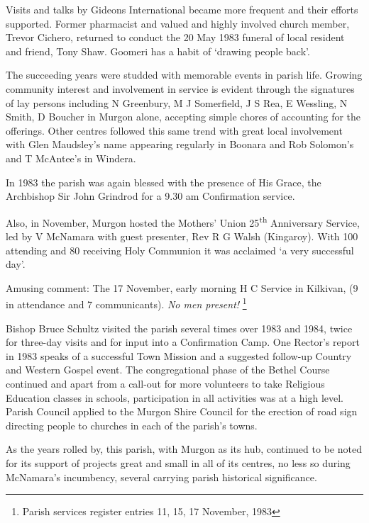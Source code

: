 Visits and talks by Gideons International became more frequent and their efforts supported. Former pharmacist and valued and highly involved church member, Trevor Cichero, returned to conduct the 20 May 1983 funeral of local resident and friend, Tony Shaw. Goomeri has a habit of `drawing people back'.



The succeeding years were studded with memorable events in parish life. Growing community interest and involvement in service is evident through the signatures of lay persons including N Greenbury, M J Somerfield, J S Rea, E Wessling, N Smith, D Boucher in Murgon alone, accepting simple chores of accounting for the offerings. Other centres followed this same trend with great local involvement with Glen Maudsley's name appearing regularly in Boonara and Rob Solomon's and T McAntee's in Windera.



In 1983 the parish was again blessed with the presence of His Grace, the Archbishop Sir John Grindrod for a 9.30 am Confirmation service.



Also, in November, Murgon hosted the Mothers' Union 25\textsuperscript{th} Anniversary Service, led by V McNamara with guest presenter, Rev R G Walsh (Kingaroy). With 100 attending and 80 receiving Holy Communion it was acclaimed `a very successful day'.



Amusing comment: The 17 November, early morning H C Service in Kilkivan, (9 in attendance and 7 communicants). \emph{No men present!} \footnote{Parish services register entries 11, 15, 17 November, 1983}


Bishop Bruce Schultz visited the parish several times over 1983 and 1984, twice for three-day visits and for input into a Confirmation Camp. One Rector's report in 1983 speaks of a successful Town Mission and a suggested follow-up Country and Western Gospel event. The congregational phase of the Bethel Course continued and apart from a call-out for more volunteers to take Religious Education classes in schools, participation in all activities was at a high level. Parish Council applied to the Murgon Shire Council for the erection of road sign directing people to churches in each of the parish's towns.



As the years rolled by, this parish, with Murgon as its hub, continued to be noted for its support of projects great and small in all of its centres, no less so during McNamara's incumbency, several carrying parish historical significance.



